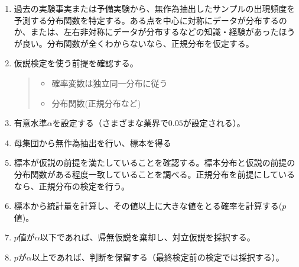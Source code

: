 \begin{framed}
    \begin{enumerate}
        \item 過去の実験事実または予備実験から、無作為抽出したサンプルの出現頻度を予測する分布関数を特定する。ある点を中心に対称にデータが分布するのか、または、左右非対称にデータが分布するなどの知識・経験があったほうが良い。分布関数が全くわからないなら、正規分布を仮定する。
        \item 仮説検定を使う前提を確認する。
        \begin{quote}
            \begin{itemize}
                \item 確率変数は独立同一分布に従う
                \item 分布関数(正規分布など)
            \end{itemize}
        \end{quote}
        \item 有意水準$\alpha$を設定する（さまざまな業界で$0.05$が設定される）。
        \item 母集団から無作為抽出を行い、標本を得る
        \item 標本が仮説の前提を満たしていることを確認する。標本分布と仮説の前提の分布関数がある程度一致していることを調べる。正規分布を前提にしているなら、正規分布の検定を行う。

        \item 標本から統計量を計算し、その値以上に大きな値をとる確率を計算する($p$値)。
        \item $p$値が$\alpha$以下であれば、帰無仮説を棄却し、対立仮説を採択する。
        \item $p$が$\alpha$以上であれば、判断を保留する（最終検定前の検定では採択する）。%
    \end{enumerate}
\end{framed}
